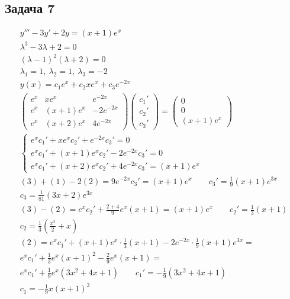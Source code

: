 \subsection*{Задача 7}
	\begin{gather*}
	y''' - 3y' + 2y = (x+1)e^x\\
	\lambda^3 - 3\lambda + 2 = 0\\
	(\lambda - 1)^2(\lambda + 2) = 0\\
	\lambda_1 = 1,\ \lambda_2 = 1,\ \lambda_3 = -2\\
	y(x) = c_1 e^{x} + c_2 xe^{x} + c_3 e^{-2x}\\
	\begin{pmatrix}
		e^{x} & xe^{x} & e^{-2x}\\
		e^{x} & (x+1)e^{x} & -2e^{-2x}\\
		e^{x} & (x+2)e^{x} & 4e^{-2x}
	\end{pmatrix}
	\begin{pmatrix}
		c_1' \\ c_2' \\ c_3'
	\end{pmatrix}
	=
	\begin{pmatrix}
		0 \\ 0 \\ (x+1)e^{x}
	\end{pmatrix}\\
	\begin{cases}
		e^{x}c_1' + xe^{x}c_2' + e^{-2x}c_3' = 0\\
		e^{x}c_1' + (x+1)e^{x}c_2' - 2e^{-2x}c_3' = 0\\
		e^{x}c_1' + (x+2)e^{x}c_2' + 4e^{-2x}c_3' = (x + 1)e^{x}
	\end{cases}\\
	(3) + (1) - 2(2) = 9 e^{-2x}c_3' = (x+1)e^x\qquad c_3'= \frac{1}{9}(x+1)e^{3x}\\
	c_3 = \frac{1}{81}(3x+2)e^{3x}\\
	(3) - (2) = e^{x}c_2' + \frac{2+4}{9}e^x (x+1) = (x+1)e^x\qquad c_2' = \frac{1}{3}(x+1)\\
	c_2 = \frac{1}{3} \left(\frac{x^2}{2} + x\right)\\
	(2) = e^x c_1' + (x+1)e^x \cdot \frac{1}{3}(x+1) - 2e^{-2x} \cdot \frac{1}{9}(x+1)e^{3x} =\\
	e^x c_1' + \frac{1}{3}e^{x}(x+1)^2 - \frac{2}{9}e^x (x+1) =\\
	e^x c_1' + \frac{1}{9} e^x (3x^2 + 4x + 1)\qquad c_1' = -\frac{1}{9}(3x^2 + 4x + 1)\\
	c_1 = -\frac{1}{9}x(x+1)^2
	\end{gather*}
